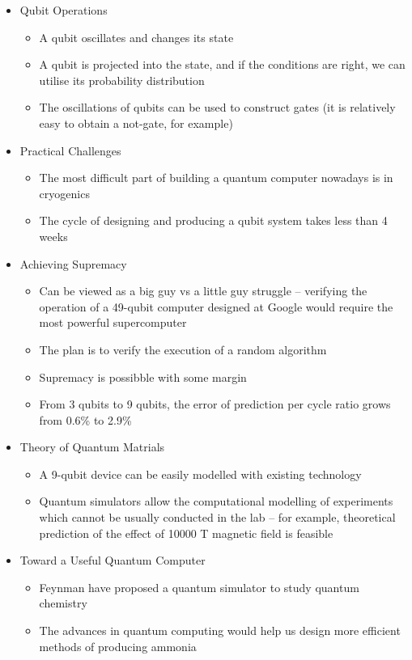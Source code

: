 \documentclass[11pt]{article}
\begin{document}
\begin{itemize}
\item Qubit Operations
\begin{itemize}
\item A qubit oscillates and changes its state
\item A qubit is projected into the state, and if the conditions are right, we can utilise its probability distribution
\item The oscillations of qubits can be used to construct gates (it is relatively easy to obtain a not-gate, for example)
\end{itemize}
\item Practical Challenges
\begin{itemize}
\item The most difficult part of building a quantum computer nowadays is in cryogenics
\item The cycle of designing and producing a qubit system takes less than 4 weeks
\end{itemize}
\item Achieving Supremacy
\begin{itemize}
\item Can be viewed as a big guy vs a little guy struggle -- verifying the operation of a 49-qubit computer designed at Google would require the most powerful supercomputer
\item The plan is to verify the execution of a random algorithm
\item Supremacy is possibble with some margin
\item From 3 qubits to 9 qubits, the error of prediction per cycle ratio grows from 0.6\% to 2.9\%
\end{itemize}
\item Theory of Quantum Matrials
\begin{itemize}
\item A 9-qubit device can be easily modelled with existing technology
\item Quantum simulators allow the computational modelling of experiments which cannot be usually conducted in the lab -- for example, theoretical prediction of the effect of 10000 T magnetic field is feasible
\end{itemize}
\item Toward a Useful Quantum Computer
\begin{itemize}
\item Feynman have proposed a quantum simulator to study quantum chemistry
\item The advances in quantum computing would help us design more efficient methods of producing ammonia

\end{itemize}
\end{itemize}
\end{document}
